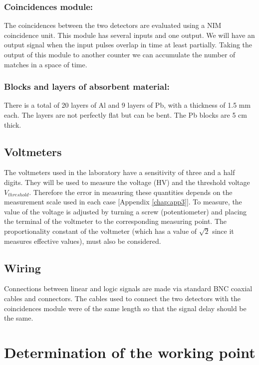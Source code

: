 		\subsubsection{Coincidences module:}

The coincidences between the two detectors are evaluated using a NIM coincidence unit. This module has several inputs and one output. We will have an output signal when the input pulses overlap in time at least partially. Taking the output of this module to another counter we can accumulate the number of matches in a space of time.


		\subsubsection{Blocks and layers of absorbent material:}

There is a total of 20 layers of Al and 9 layers of Pb, with a thickness of 1.5 mm each.  The layers are not perfectly flat but can be bent. The Pb blocks are 5 cm thick.


		\subsection{Voltmeters}

The voltmeters used in the laboratory have a sensitivity of three and a half digits. They will be used to measure the voltage (HV) and the threshold voltage $V_{threshold}$. Therefore the error in measuring these quantities depends on the measurement scale used in each case [Appendix \ref{chap:app3}]. To measure, the value of the voltage is adjusted by turning a screw (potentiometer) and placing the terminal of the voltmeter to the corresponding measuring point. The proportionality constant of the voltmeter (which has a value of $\sqrt{2}$ since it measures effective values), ​​must also be considered.


		\subsection{Wiring}

Connections between linear and logic signals are made via standard BNC coaxial cables and connectors. The cables used to connect the two detectors with the coincidences module were of the same length so that the signal delay should be the same.


		\section{Determination of the working point}


